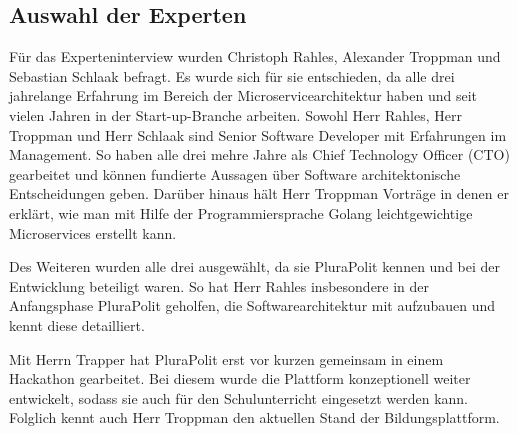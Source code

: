 \subsection{Auswahl der Experten}

Für das Experteninterview wurden Christoph Rahles, Alexander Troppman und Sebastian Schlaak befragt. Es wurde sich für sie entschieden, da alle drei jahrelange Erfahrung im Bereich der Microservicearchitektur haben und seit vielen Jahren in der Start-up-Branche arbeiten. Sowohl Herr Rahles, Herr Troppman und Herr Schlaak sind Senior Software Developer mit Erfahrungen im Management. So haben alle drei mehre Jahre als Chief Technology Officer (CTO) gearbeitet und können fundierte Aussagen über Software architektonische Entscheidungen geben. Darüber hinaus hält Herr Troppman Vorträge in denen er erklärt, wie man mit Hilfe der Programmiersprache Golang leichtgewichtige Microservices erstellt kann.

Des Weiteren wurden alle drei ausgewählt, da sie PluraPolit kennen und bei der Entwicklung beteiligt waren. So hat Herr Rahles insbesondere in der Anfangsphase PluraPolit geholfen, die Softwarearchitektur mit aufzubauen und kennt diese detailliert.

Mit Herrn Trapper hat PluraPolit erst vor kurzen gemeinsam in einem Hackathon gearbeitet. Bei diesem wurde die Plattform konzeptionell weiter entwickelt, sodass sie auch für den Schulunterricht eingesetzt werden kann. Folglich kennt auch Herr Troppman den aktuellen Stand der Bildungsplattform.

